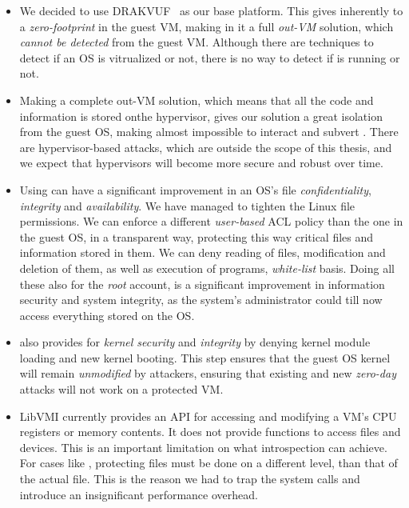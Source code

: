 \begin{itemize}
\item We decided to use DRAKVUF~\cite{lengyel2014drakvuf} as our base platform. This gives inherently to  a \emph{zero-footprint} in the guest \ac{VM}, making in it a full \emph{out-\ac{VM}} solution, which \emph{cannot be detected} from the guest \ac{VM}. Although there are techniques to detect if an \ac{OS} is vitrualized or not, there is no way to detect if  is running or not.

\item Making  a complete out-\ac{VM} solution, which means that all the code and information is stored onthe hypervisor, gives our solution a great isolation from the guest \ac{OS}, making almost impossible to interact and subvert . There are hypervisor-based attacks, which are outside the scope of this thesis, and we expect that hypervisors will become more secure and robust over time.

\item Using  can have a significant improvement in an \ac{OS}'s file \emph{confidentiality}, \emph{integrity} and \emph{availability}. We have managed to tighten the Linux file permissions. We can enforce a different \emph{user-based}  \ac{ACL} policy than the one in the guest \ac{OS}, in a transparent way, protecting this way critical files and information stored in them. We can deny reading of files, modification and deletion of them, as well as execution of programs,  \emph{white-list} basis. Doing all these also for the \emph{root} account, is a significant improvement in information security and system integrity, as the system's administrator could till now access everything stored on the \ac{OS}.

\item {} also provides for \emph{kernel security} and \emph{integrity} by denying kernel module loading and new kernel booting. This step ensures that the guest \ac{OS} kernel will remain \emph{unmodified} by attackers, ensuring that existing and new \emph{zero-day} attacks will not work on a  protected \ac{VM}.

\item LibVMI currently provides an \ac{API} for accessing and modifying a \ac{VM}'s \ac{CPU} registers or memory contents. It does not provide functions to access files and devices. This is an important limitation on what introspection can achieve. For cases like , protecting files must be done on a different level, than that of the actual file. This is the reason we had to trap the system calls and introduce an insignificant performance overhead.


\end{itemize}
